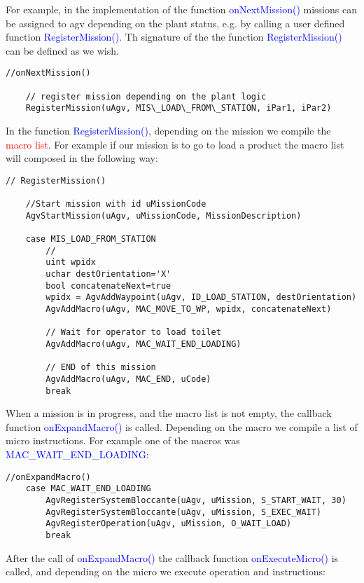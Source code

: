 For example, in the implementation of the function \textcolor{blue}{onNextMission()} missions can be assigned to agv depending on the plant status, e.g. by calling a user defined function \textcolor{blue}{RegisterMission()}. Th signature of the the function \textcolor{blue}{RegisterMission()} can be defined as we wish.

\begin{lstlisting}[caption=onNextMission() missions are assigned]
	//onNextMission()
	
	// register mission depending on the plant logic
	RegisterMission(uAgv, MIS\_LOAD\_FROM\_STATION, iPar1, iPar2)
\end{lstlisting}

In the function \textcolor{blue}{RegisterMission()}, depending on the mission we compile the \textcolor{red}{macro list}. For example if our mission is to go to load a product the macro list will composed in the following way:
\begin{lstlisting}[caption=RegisterMission() macro list is composed]
	// RegisterMission()
	
	//Start mission with id uMissionCode
	AgvStartMission(uAgv, uMissionCode, MissionDescription)

	case MIS_LOAD_FROM_STATION
		//
		uint wpidx
		uchar destOrientation='X'
		bool concatenateNext=true
		wpidx = AgvAddWaypoint(uAgv, ID_LOAD_STATION, destOrientation)
		AgvAddMacro(uAgv, MAC_MOVE_TO_WP, wpidx, concatenateNext)
		
		// Wait for operator to load toilet
		AgvAddMacro(uAgv, MAC_WAIT_END_LOADING)
		
		// END of this mission
		AgvAddMacro(uAgv, MAC_END, uCode)
		break
\end{lstlisting}

When a mission is in progress, and the macro list is not empty, the callback function \textcolor{blue}{onExpandMacro()} is called. Depending on the macro we compile a list of micro instructions. For example one of the macros was \textcolor{blue}{MAC\_WAIT\_END\_LOADING}:

\begin{lstlisting}[caption= onExpandMacro() micro list is composed]
	//onExpandMacro()
	case MAC_WAIT_END_LOADING
		AgvRegisterSystemBloccante(uAgv, uMission, S_START_WAIT, 30)
		AgvRegisterSystemBloccante(uAgv, uMission, S_EXEC_WAIT)
		AgvRegisterOperation(uAgv, uMission, O_WAIT_LOAD)
		break
\end{lstlisting}

After the call of \textcolor{blue}{onExpandMacro()} the callback function \textcolor{blue}{onExecuteMicro()} is called, and depending on the micro we execute operation and instructions:

